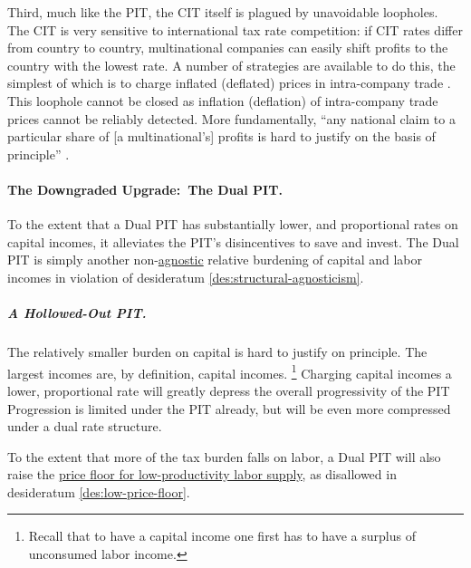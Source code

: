 Third, much like the PIT, the CIT itself is plagued by unavoidable loopholes.
The CIT is very sensitive to international tax rate competition:
if CIT rates differ from country to country, multinational companies can easily shift profits to the country with the lowest rate.
A number of strategies are available to do this, the simplest of which is to charge inflated (deflated) prices in intra-company trade \citep[43ff]{Ganghof2004}.
This loophole cannot be closed as inflation (deflation) of intra-company trade prices cannot be reliably detected.
More fundamentally, ``any national claim to a particular share of [a multinational's] profits is hard to justify on the basis of principle'' \citep[61]{Genschel2005}.


\paragraph{The Downgraded Upgrade:\ The Dual PIT.}
	\label{sec:ScoreDualPIT}
To the extent that a Dual PIT has substantially lower, and proportional rates on capital incomes, it alleviates the PIT's disincentives to save and invest.
The Dual PIT is simply another non-\hyperref[des:structural-agnosticism]{agnostic} relative burdening of capital and labor incomes in violation of desideratum \ref{des:structural-agnosticism}.

\subparagraph{A Hollowed-Out PIT.}
The relatively smaller burden on capital is hard to justify on principle.
The largest incomes are, by definition, capital incomes.
\footnote{
	Recall that to have a capital income one first has to have a surplus of unconsumed labor income.
}
Charging capital incomes a lower, proportional rate will greatly depress the overall progressivity of the PIT
Progression is limited under the PIT already, but will be even more compressed under a dual rate structure.

To the extent that more of the tax burden falls on labor, a Dual PIT will also raise the \hyperref[des:low-price-floor]{price floor for low-productivity labor supply}, as disallowed in desideratum \ref{des:low-price-floor}.

